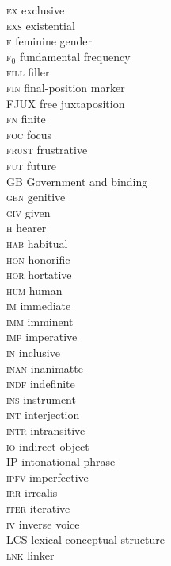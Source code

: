 \begin{multicols}{2}
\begin{tabbing}
 \textsc{ex}  \> exclusive \\
 \textsc{exs}  \> existential \\
 \textsc{f}  \> feminine gender \\
 \textsc{f$_0$} \> fundamental frequency \\
 \textsc{fill}  \> filler \\
 \textsc{fin}  \> final-position marker \\
 \textsc{FJUX}  \> free juxtaposition \\
 \textsc{fn}  \> finite \\
 \textsc{foc}  \> focus \\
 \textsc{frust}  \> frustrative \\
 \textsc{fut}  \> future \\
  \textsc{GB}  \> Government and binding \\
 \textsc{gen}  \> genitive \\
 \textsc{giv}  \> given \\
 \textsc{h}  \> hearer \\
 \textsc{hab}  \> habitual \\
 \textsc{hon}  \> honorific \\
 \textsc{hor}  \> hortative \\
 \textsc{hum}  \> human \\
 \textsc{im}  \> immediate \\
 \textsc{imm}  \> imminent \\
 \textsc{imp}  \> imperative \\
 \textsc{in}  \> inclusive \\
 \textsc{inan}  \> inanimatte \\
 \textsc{indf}  \> indefinite \\
 \textsc{ins}  \> instrument \\
 \textsc{int}  \> interjection \\
 \textsc{intr}  \> intransitive \\
 \textsc{io}  \> indirect object \\
 \textsc{IP}  \> intonational phrase \\
 \textsc{ipfv}  \> imperfective \\
 \textsc{irr}  \> irrealis \\
 \textsc{iter}  \> iterative \\
 \textsc{iv}  \> inverse voice \\
 \textsc{LCS}  \> lexical-conceptual structure \\
 \textsc{lnk}  \> linker \\

\end{tabbing}
\end{multicols}
